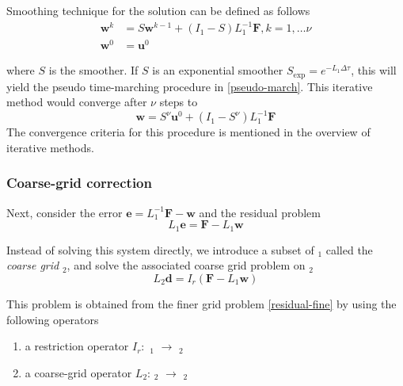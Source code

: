 Smoothing technique for the solution can be defined as follows
\begin{equation}
\begin{split}
    \mathbf{w}^k &= S\mathbf{w}^{k-1} + (I_1 - S)L_1^{-1}\mathbf{F}, k = 1, \dots \nu \\
    \mathbf{w}^0 &= \mathbf{u}^0
\end{split}
\end{equation}

where $S$ is the smoother. If $S$ is an exponential smoother $S_{\text{exp}} = e^{-L_1\Delta\tau}$, this will yield the pseudo time-marching procedure in \autoref{pseudo-march}. This iterative method would converge after $\nu$ steps to 
\begin{equation}
    \mathbf{w} = S^{\nu} \mathbf{u}^0 + (I_1 - S^{\nu})L_1^{-1}\mathbf{F}
    \label{converged_iter}
\end{equation}
The convergence criteria for this procedure is mentioned in the overview of iterative methods.

\subsubsection{Coarse-grid correction}

Next, consider the error $\mathbf{e} = L_1^{-1}\mathbf{F} - \mathbf{w}$ and the residual problem
\begin{equation}
    L_1\mathbf{e} = \mathbf{F} - L_1\mathbf{w}    
    \label{residual-fine}
\end{equation}

Instead of solving this system directly, we introduce a subset of \text{$\Omega$}$_1$ called the \textit{coarse grid} \text{$\Omega$}$_2$, and solve the associated coarse grid problem on \text{$\Omega$}$_2$
\begin{equation}
    L_2\mathbf{d} = I_r(\mathbf{F} - L_1\mathbf{w})
    \label{correction_problem}
\end{equation}

This problem is obtained from the finer grid problem \autoref{residual-fine} by using the following operators

\begin{enumerate}
    \item a restriction operator $I_r:$ \text{$\Omega$}$_1$ $\xrightarrow{}$ \text{$\Omega$}$_2$
    \item a coarse-grid operator $L_2$: \text{$\Omega$}$_2$ $\xrightarrow{}$ \text{$\Omega$}$_2$
\end{enumerate}

